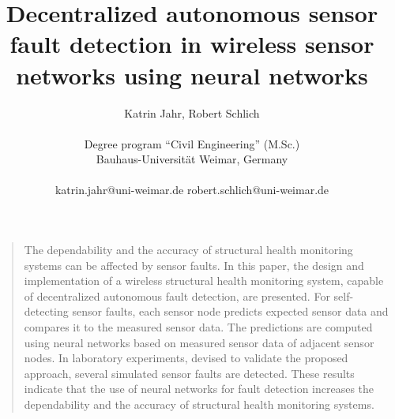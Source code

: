 \documentclass[12pt,a4paper]{scrartcl}
\title{\textbf{ \Large {Decentralized autonomous sensor fault detection in wireless sensor networks using neural networks}}}
\author
{\large Katrin Jahr, Robert Schlich\\
\\
\normalsize{Degree program “Civil Engineering” (M.Sc.)}\\
\normalsize{Bauhaus-Universität Weimar, Germany}\\
\\
\normalsize{katrin.jahr@uni-weimar.de \qquad}
\normalsize{robert.schlich@uni-weimar.de}
}
\date{}
\newenvironment{sciabstract}{%
\begin{quote} \itshape}
{\end{quote}}
\begin{document}
 


\baselineskip20pt

\frenchspacing


\maketitle 
\vspace{-2em}

% 
\sloppy
\setlength{\emergencystretch}{6pt}

\begin{sciabstract}

The dependability and the accuracy of structural health moni\-toring systems can be affected by sensor faults. 
In this paper, the design and implementation of a wireless structural health monitoring system, capable of decentralized autonomous fault detection, are presented. 
For self-detecting sensor faults, each sensor node predicts expected sensor data and compares it to the measured sensor data. 
The predictions are computed using neural networks based on measured sensor data of adjacent sensor nodes.
In laboratory experiments, devised to validate the proposed approach, several simulated sensor faults are detected.
These results indicate that the use of neural networks for fault detection increases the dependability and the accuracy of structural health monitoring systems.

\end{sciabstract}

%
%
%
\end{document}
